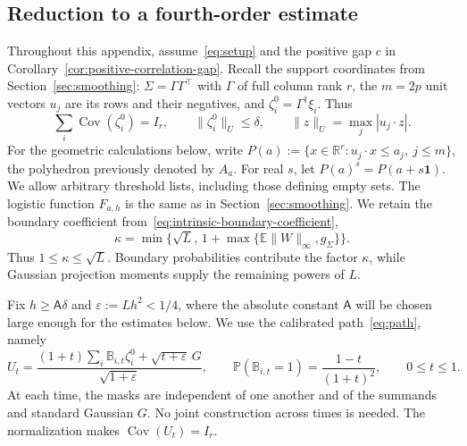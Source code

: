 \documentclass[11pt,letterpaper]{article}
\theoremstyle{remark}
\newcommand{\E}{\mathbb E}
\newcommand{\Pp}{\mathbb P}
\newcommand{\R}{\mathbb R}
\newcommand{\Cov}{\operatorname{Cov}}
\begin{document}
\subsection{Reduction to a fourth-order estimate}\label{hgap:sec:reduction}

Throughout this appendix, assume~\eqref{eq:setup} and the positive gap
$c$ in Corollary~\ref{cor:positive-correlation-gap}. Recall the support
coordinates from Section~\ref{sec:smoothing}: $\Sigma=\Gamma\Gamma^\top$
with $\Gamma$ of full column rank $r$, the $m=2p$ unit vectors $u_j$
are its rows and their negatives, and
$\zeta_i^0=\Gamma^\dagger\xi_i$. Thus
\[
 \sum_i\Cov(\zeta_i^0)=I_r,\qquad
 \|\zeta_i^0\|_U\le\delta,
 \qquad \|z\|_U=\max_j|u_j\cdot z|.
\]
For the geometric calculations below, write
$P(a):=\{x\in\R^r:u_j\cdot x\le a_j,\ j\le m\}$, the polyhedron
previously denoted by $A_a$. For real $s$, let $P(a)^s=P(a+s\mathbf1)$.
We allow arbitrary threshold lists, including those defining empty sets.
The logistic function $F_{a,h}$ is the same as in
Section~\ref{sec:smoothing}. We retain the boundary coefficient
from~\eqref{eq:intrinsic-boundary-coefficient},
\[
 \kappa=\min\{\sqrt L,\,1+\max\{\E\|W\|_\infty,g_\Sigma\}\}.
\]
Thus $1\le\kappa\le\sqrt L$. Boundary probabilities contribute the
factor $\kappa$, while Gaussian projection moments supply the remaining
powers of $L$.

Fix $h\ge\mathsf A\delta$ and $\varepsilon:=Lh^2<1/4$, where the
absolute constant $\mathsf A$ will be chosen large enough for the
estimates below. We use the calibrated path~\eqref{eq:path}, namely
\begin{equation}\label{hgap:eq:path}
 U_t=\frac{(1+t)\sum_i\mathbb B_{i,t}\zeta_i^0
                       +\sqrt{t+\varepsilon}\,G}{\sqrt{1+\varepsilon}},
 \qquad \Pp(\mathbb B_{i,t}=1)=\frac{1-t}{(1+t)^2},
 \qquad 0\le t\le1.
\end{equation}
At each time, the masks are independent of one another and of the
summands and standard Gaussian $G$. No joint construction across times
is needed. The normalization makes $\Cov(U_t)=I_r$.
\end{document}
